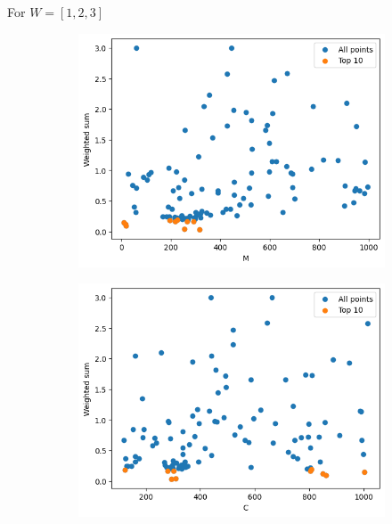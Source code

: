 \begin{frame}
    For \(W = [1, 2, 3]\)
    \begin{figure}
        \centering
        \hfill
        \begin{subfigure}{0.45\textwidth}
            \includegraphics[width=\textwidth]{../images/report/w123-M.png}
        \end{subfigure}
        \hfill
        \begin{subfigure}{0.45\textwidth}
            \includegraphics[width=\textwidth]{../images/report/w123-C.png}
        \end{subfigure}
        \hfill
        

\end{figure}
\end{frame}
